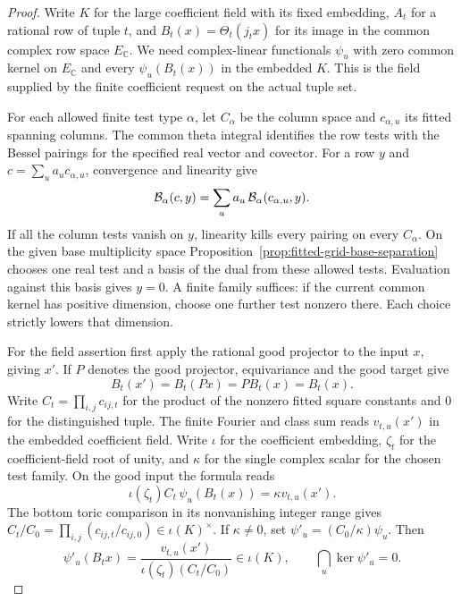 \begin{proof}
Write \(K\) for the large coefficient field with its fixed
embedding, \(A_t\) for a rational row of tuple \(t\), and
\(B_t(x)=\Theta_t(j_t x)\) for its image in the
common complex row space \(E_\mathbb C\). We need complex-linear
functionals \(\psi_u\) with zero common kernel on
\(E_\mathbb C\) and every \(\psi_u(B_t(x))\) in the
embedded \(K\). This is the field supplied by the finite
coefficient request on the actual tuple set.

For each allowed finite test type \(\alpha\), let
\(C_\alpha\) be the column space and \(c_{\alpha,u}\) its fitted
spanning columns. The common theta integral identifies the row
tests with the Bessel pairings for the specified real vector and
covector. For a row \(y\) and \(c=\sum_u a_uc_{\alpha,u}\), convergence
and linearity give
\[
 {\cal B}_\alpha(c,y)=\sum_u a_u\,{\cal B}_\alpha(c_{\alpha,u},y).
\]
If all the column tests vanish on \(y\), linearity kills every pairing on every \(C_\alpha\). On the given base multiplicity space Proposition~\ref{prop:fitted-grid-base-separation} chooses one real test and a basis of the dual from these allowed tests. Evaluation against this basis gives \(y=0\).
A finite family suffices: if the current common kernel has positive
dimension, choose one further test nonzero there. Each choice
strictly lowers that dimension. \label{cor:automorphic-realization-11}

For the field assertion first apply the rational good
projector to the input \(x\), giving \(x'\). If \(P\) denotes the good projector, equivariance and the good target give
\[
 B_t(x')=B_t(Px)=P B_t(x)=B_t(x).
\] Write \(C_t=\prod_{i,j}c_{ij,t}\) for
the product of the nonzero fitted square constants and
\(0\) for the distinguished tuple. The finite Fourier and
class sum reads \(v_{t,u}(x')\) in the embedded coefficient
field. Write \(\iota\) for the coefficient embedding, \(\zeta_t\)
for the coefficient-field root of unity, and \(\kappa\) for
the single complex scalar for the chosen test family.
On the good input the formula reads
\[
   \iota(\zeta_t) C_t\,\psi_u(B_t(x))
     = \kappa v_{t,u}(x').
\]
The bottom toric comparison in its nonvanishing integer range gives
\(C_t/C_0=\prod_{i,j}(c_{ij,t}/c_{ij,0})\in\iota(K)^\times\).
If \(\kappa\ne0\), set \(\psi'_u=(C_0/\kappa)\psi_u\). Then
\[
 \psi'_u(B_t x)=\frac{v_{t,u}(x')}{\iota(\zeta_t)(C_t/C_0)}
             \in\iota(K),\qquad \bigcap_u\ker\psi'_u=0.
\]


\end{proof}
